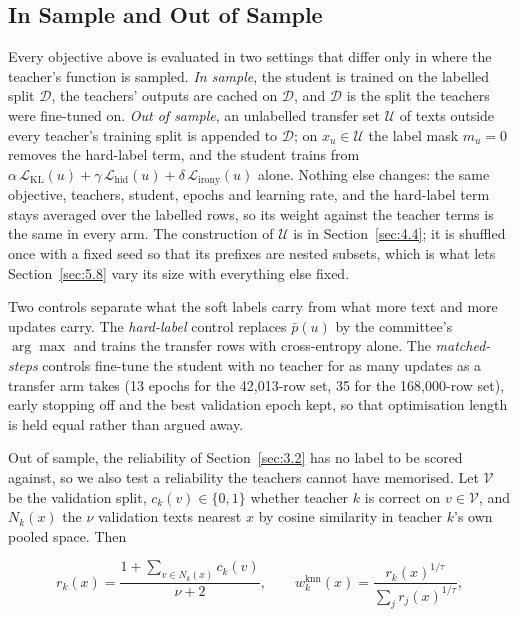 \subsection{In Sample and Out of Sample}
\label{sec:3.5}
Every objective above is evaluated in two settings that differ only in where the teacher's function
is sampled. \emph{In sample}, the student is trained on the labelled split $\mathcal{D}$, the
teachers' outputs are cached on $\mathcal{D}$, and $\mathcal{D}$ is the split the teachers were
fine-tuned on. \emph{Out of sample}, an unlabelled transfer set $\mathcal{U}$ of texts outside every
teacher's training split is appended to $\mathcal{D}$; on $x_u \in \mathcal{U}$ the label mask $m_u
= 0$ removes the hard-label term, and the student trains from $\alpha\, \mathcal{L}_{\mathrm{KL}}(u)
+ \gamma\, \mathcal{L}_{\mathrm{hid}}(u) + \delta\, \mathcal{L}_{\mathrm{irony}}(u)$ alone. Nothing
else changes: the same objective, teachers, student, epochs and learning rate, and the hard-label
term stays averaged over the labelled rows, so its weight against the teacher terms is the same in
every arm. The construction of $\mathcal{U}$ is in Section~\ref{sec:4.4}; it is shuffled once with a
fixed seed so that its prefixes are nested subsets, which is what lets Section~\ref{sec:5.8} vary
its size with everything else fixed.

Two controls separate what the soft labels carry from what more text and more updates carry. The
\emph{hard-label} control replaces $\bar p(u)$ by the committee's $\arg\max$ and trains the transfer
rows with cross-entropy alone. The \emph{matched-steps} controls fine-tune the student with no
teacher for as many updates as a transfer arm takes (13 epochs for the 42,013-row set, 35 for the
168,000-row set), early stopping off and the best validation epoch kept, so that optimisation length
is held equal rather than argued away.

Out of sample, the reliability of Section~\ref{sec:3.2} has no label to be scored against, so we
also test a reliability the teachers cannot have memorised. Let $\mathcal{V}$ be the validation
split, $c_k(v) \in \{0, 1\}$ whether teacher $k$ is correct on $v \in \mathcal{V}$, and $N_k(x)$ the
$\nu$ validation texts nearest $x$ by cosine similarity in teacher $k$'s own pooled space. Then

\begin{equation}
r_k(x) = \frac{1 + \sum_{v \in N_k(x)} c_k(v)}{\nu + 2}, \qquad
w_k^{\mathrm{knn}}(x) = \frac{r_k(x)^{1/\tau}}{\sum_j r_j(x)^{1/\tau}},
\end{equation}

